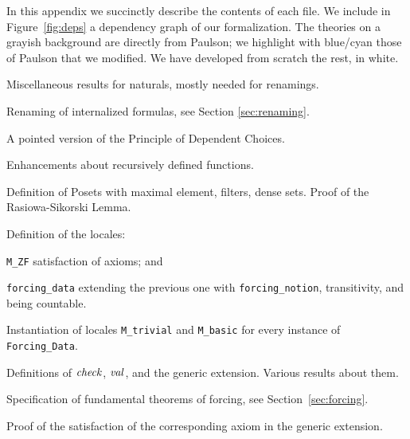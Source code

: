 In this appendix we succinctly describe the contents of each file. We
include in 
Figure~\ref{fig:deps}  a dependency graph of our formalization. The
theories on a grayish background are directly from Paulson; we
highlight with blue/cyan those of Paulson that we modified. We
have developed from scratch the rest, in white.

\begin{description}[itemsep=1.5pt]
\item[\texttt{Nat\_Miscelanea}]Miscellaneous results for naturals, mostly
  needed for renamings.
\item[\texttt{Renaming}] Renaming of internalized formulas, see
  Section \ref{sec:renaming}.
\item[\texttt{Pointed\_DC}] A pointed version of the Principle of
  Dependent Choices.
\item[\texttt{Recursion\_Thms}] Enhancements about recursively defined
  functions.
\item[\texttt{Forcing\_Notions}] Definition of Posets with maximal
  element, filters, dense sets. Proof of the Rasiowa-Sikorski Lemma.
\item[\texttt{Forcing\_Data}] Definition of the locales:
  \begin{inlinelist}
  \item \texttt{M\_ZF} satisfaction of axioms; and 
  \item \texttt{forcing\_data} extending the previous one with
    \texttt{forcing\_notion}, transitivity, and being countable.
  \end{inlinelist}
\item[\texttt{Interface}] Instantiation of locales \texttt{M\_trivial}
  and \texttt{M\_basic} for every instance of \texttt{Forcing\_Data}.
\item[\texttt{Names}] Definitions of $\operatorname{\mathit{check}}$, $\operatorname{\mathit{val}}$, and the generic
  extension. Various results about them.
\item[\texttt{Forcing\_Theorems}] Specification of fundamental
  theorems of forcing, see Section~\ref{sec:forcing}.
\item[\texttt{*\_Axiom}] Proof of the satisfaction of the
  corresponding axiom in the generic extension.
\end{description}
%
